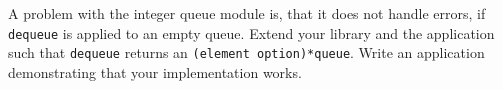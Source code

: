 A problem with the integer queue module is, that it does not handle errors, if \lstinline{dequeue} is applied to an empty queue. Extend your library and the application such that \lstinline{dequeue} returns an \lstinline{(element option)*queue}. Write an application demonstrating that your implementation works.
